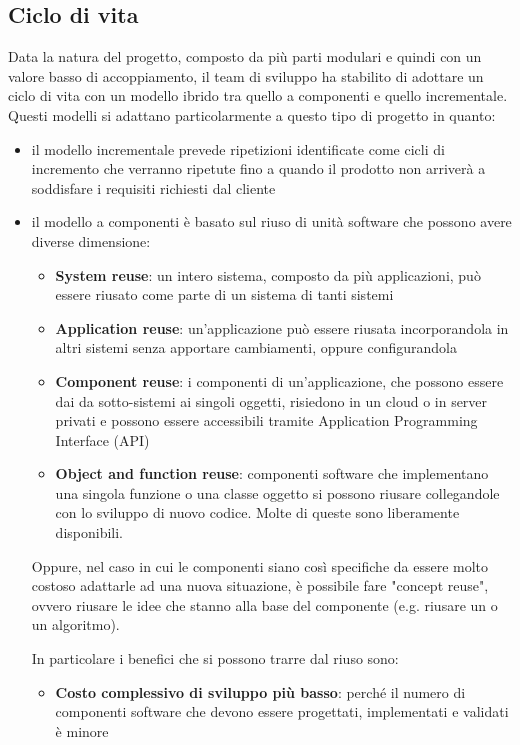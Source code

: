 	\subsection{Ciclo di vita} %
	Data la natura del progetto, composto da più parti modulari e quindi con un valore basso di accoppiamento, il team di sviluppo ha stabilito di adottare un ciclo di vita con un modello ibrido tra quello a componenti e quello incrementale.
	Questi modelli si adattano particolarmente a questo tipo di progetto in quanto:
	\begin{itemize}
		\item il modello incrementale prevede ripetizioni identificate come cicli di incremento che verranno ripetute fino a quando il prodotto non arriverà a soddisfare i requisiti richiesti dal cliente
		\item il modello a componenti è basato sul riuso di unità software che possono avere diverse dimensione:
		\begin{itemize}
			\item \textbf{System reuse}: un intero sistema, composto da più applicazioni, può essere riusato come parte di un sistema di tanti sistemi
			\item \textbf{Application reuse}: un'applicazione può essere riusata incorporandola in altri sistemi senza apportare cambiamenti, oppure configurandola
			\item \textbf{Component reuse}: i componenti di un'applicazione, che possono essere dai da sotto-sistemi ai singoli oggetti, risiedono in un cloud o in server privati e possono essere accessibili tramite Application Programming Interface (API)
			\item \textbf{Object and function reuse}: componenti software che implementano una singola funzione o una classe oggetto si possono riusare collegandole con lo sviluppo di nuovo codice. Molte di queste sono liberamente disponibili. 
		\end{itemize}
		Oppure, nel caso in cui le componenti siano così specifiche da essere molto costoso adattarle ad una nuova situazione, è possibile fare "concept reuse", ovvero riusare le idee che stanno alla base del componente (e.g. riusare un  o un algoritmo). \par
		In particolare i benefici che si possono trarre dal riuso sono:
		\begin{itemize}
			\item \textbf{Costo complessivo di sviluppo più basso}: perché il numero di componenti software che devono essere progettati, implementati e validati è minore

\end{itemize}
\end{itemize}
